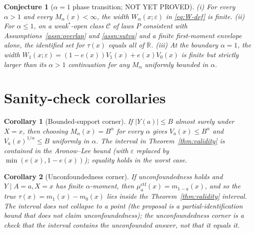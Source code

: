 \documentclass[11pt]{article}
\newcommand{\R}{\mathbb{R}}
\theoremstyle{definition}
\theoremstyle{plain}
\newtheorem{conjecture}{Conjecture}
\newtheorem{corollary}{Corollary}
\theoremstyle{remark}
\begin{document}
\begin{conjecture}[$\alpha=1$ phase transition; NOT YET PROVED]\label{conj:phase}
\emph{(i)} For every $\alpha>1$ and every $M_\alpha(x)<\infty$, the width
$W_\alpha(x;\varepsilon)$ in \eqref{eq:W-def} is finite. \emph{(ii)} For
$\alpha\le 1$, on a weak$^*$-open class $\mathcal{C}$ of laws $P$ consistent with
Assumptions~\ref{assn:overlap} and \ref{assn:sutva} and a finite first-moment
envelope alone, the identified set for $\tau(x)$ equals all of $\R$. \emph{(iii)}
At the boundary $\alpha=1$, the width $W_1(x;\varepsilon) = (1-e(x))V_1(x) + e(x)V_0(x)$
is finite but strictly larger than its $\alpha>1$ continuation for any
$M_\alpha$ uniformly bounded in $\alpha$.
\end{conjecture}

\section{Sanity-check corollaries}

\begin{corollary}[Bounded-support corner]\label{cor:bounded}
If $|Y(a)| \le B$ almost surely under $X=x$, then choosing
$M_\alpha(x) = B^\alpha$ for every $\alpha$ gives $V_a(x) \le B^\alpha$ and
$V_a(x)^{1/\alpha} \le B$ uniformly in $\alpha$. The interval in Theorem~\ref{thm:validity}
is contained in the Aronow--Lee bound (with $\varepsilon$ replaced by $\min(e(x), 1-e(x))$);
equality holds in the worst case.
\end{corollary}

\begin{corollary}[Unconfoundedness corner]\label{cor:unconf}
If unconfoundedness holds and $Y \mid A=a, X=x$ has finite $\alpha$-moment, then
$\mu_a^{\mathrm{ctf}}(x) = m_{1-a}(x)$, and so the true $\tau(x) = m_1(x) - m_0(x)$
lies inside the Theorem~\ref{thm:validity} interval. The interval does not collapse
to a point (the proposal is a partial-identification bound that does not claim
unconfoundedness); the unconfoundedness corner is a check that the interval
\emph{contains} the unconfounded answer, not that it equals it.
\end{corollary}
\end{document}
